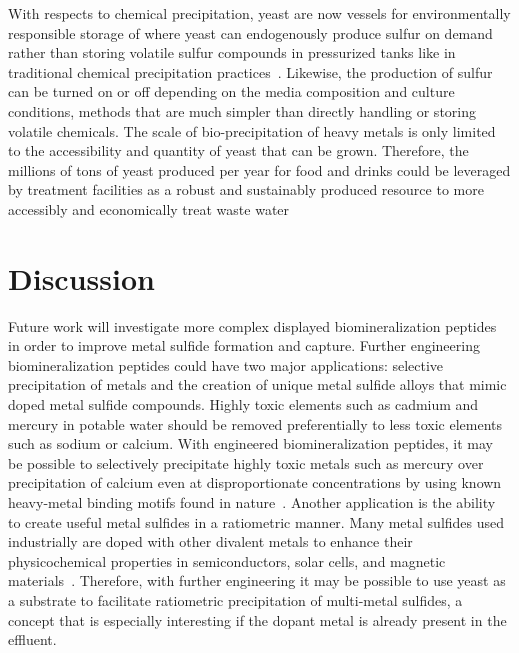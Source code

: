 \documentclass[../main/main]{subfiles}
\begin{document}
With respects to chemical precipitation, yeast are now vessels for environmentally responsible storage of \HS{} where yeast can endogenously produce sulfur on demand rather than storing volatile sulfur compounds in pressurized tanks like in traditional chemical precipitation practices~\cite{fu2011removal,kurniawan2006,kumargupta2012}. Likewise, the production of sulfur can be turned on or off depending on the media composition and culture conditions, methods that are much simpler than directly handling or storing volatile chemicals. The scale of bio-precipitation of heavy metals is only limited to the accessibility and quantity of yeast that can be grown. Therefore, the millions of tons of yeast produced per year for food and drinks could be leveraged by treatment facilities as a robust and sustainably produced resource to more accessibly and economically treat waste water

\section{Discussion}
Future work will investigate more complex displayed biomineralization peptides in order to improve metal sulfide formation and capture. Further engineering biomineralization peptides could have two major applications: selective precipitation of metals and the creation of unique metal sulfide alloys that mimic doped metal sulfide compounds. Highly toxic elements such as cadmium and mercury in potable water should be removed preferentially to less toxic elements such as sodium or calcium. With engineered biomineralization peptides, it may be possible to selectively precipitate highly toxic metals such as mercury over precipitation of calcium even at disproportionate concentrations by using known heavy-metal binding motifs found in nature~\cite{picard2018,sakimoto2016,sweeney2004,rugh1996}. Another application is the ability to create useful metal sulfides in a ratiometric manner. Many metal sulfides used industrially are doped with other divalent metals to enhance their physicochemical properties in semiconductors, solar cells, and magnetic materials~\cite{arai2008,parveen2018,bhattacharya2007}. Therefore, with further engineering it may be possible to use yeast as a substrate to facilitate ratiometric precipitation of multi-metal sulfides, a concept that is especially interesting if the dopant metal is already present in the effluent.
\end{document}
